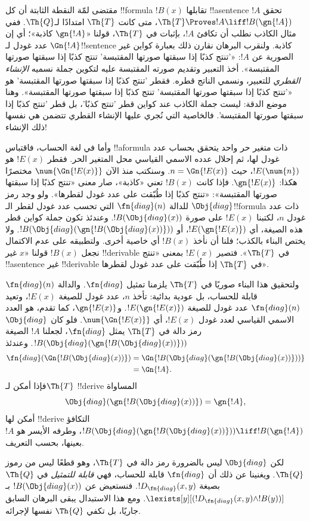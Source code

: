 \documentclass[../../../include/open-logic-section]{subfiles}
\begin{document}


\begin{explain}
مقتضى لمّة النقطة الثابتة أن كل !!{formula} $!B(x)$ تقابلها
!!a{sentence} $!A$ تحقق $\Th{T}\Proves !A\liff !B(\gn{!A})$،
متى كانت $\Th{T}$ امتدادًا لـ$\Th{Q}$. ففي مثال الكاذب نطلب
أن تكافئ $!A$، بإثبات في $\Th{T}$، قولنا «$\gn{!A}$ كاذبة»؛
أي إن $\Gn{!A}$ عدد غودل لـ!!{sentence} كاذبة. ولنقرب البرهان
نقارن ذلك بعبارة كواين غير الصورية عن $!A$: «'تنتج كذبًا إذا
سبقتها صورتها المقتبسة' تنتج كذبًا إذا سبقتها صورتها المقتبسة».
أخذ التعبير وتقديم صورته المقتبسة عليه لتكوين جملة نسميه
\emph{الإنشاء القطري} للتعبير، ونسمي الناتج قطره.
فقطر 'تنتج كذبًا إذا سبقتها صورتها المقتبسة' هو «'تنتج كذبًا إذا
سبقتها صورتها المقتبسة' تنتج كذبًا إذا سبقتها صورتها المقتبسة».
وهنا موضع الدقة: ليست جملة الكاذب عند كواين قطر 'تنتج كذبًا'،
بل قطر 'تنتج كذبًا إذا سبقتها صورتها المقتبسة'. فالخاصية التي
نُجري عليها الإنشاء القطري تتضمن هي نفسها ذلك الإنشاء!{}

وأما في لغة الحساب، فاقتباس !!a{formula} ذات متغير حر واحد
يتحقق بحساب عدد غودل لها، ثم إحلال عدده الاسمي القياسي محل
المتغير الحر. فقطر $!E(x)$ هو $!E(\num{n})$، حيث
$n=\Gn{!E(x)}$. وسنكتب منذ الآن $\num{\Gn{!E(x)}}$
مختصرًا هكذا: $\gn{!E(x)}$. فإذا كانت $!B(x)$ تعني «كاذبة»،
صار معنى «تنتج كذبًا إذا سبقتها صورتها المقتبسة»: «تنتج كذبًا
إذا طُبّقت على عدد غودل لقطرها». ولو وجد رمز $\Obj{diag}$
للدالة $\fn{diag}(n)$ التي تحسب عدد غودل لقطر الـ!!{formula}
ذات عدد غودل $n$، لكتبنا $!E(x)$ على صورة $!B(\Obj{diag}(x))$.
وعندئذ تكون جملة كواين قطر هذه الصيغة، أي $!E(\gn{!E(x)})$،
أو $!B(\Obj{diag}(\gn{!B(\Obj{diag}(x))}))$. ولا يختص البناء
بالكذب؛ فلنا أن نأخذ $!B(x)$ أي خاصية أخرى. ولتطبيقه على عدم
الاكتمال نجعل $!B(x)$ قولنا «$x$ غير !!{derivable} في
$\Th{T}$». فتصير $!E(x)$ بمعنى «تنتج !!a{sentence} غير
!!{derivable} في $\Th{T}$ إذا طُبّقت على عدد غودل لقطرها».

ولتحقيق هذا البناء صوريًا في $\Th{T}$ يلزمنا تمثيل
$\fn{diag}$. والدالة $\fn{diag}(n)$ قابلة للحساب، بل عودية
بدائية: تأخذ $n$، عدد غودل للصيغة $!E(x)$، وتعيد
$\fn{diag}(n)$ عدد غودل للصيغة $!E(\gn{!E(x)})$.
و$\gn{!E(x)}$، كما تقدم، هو العدد الاسمي القياسي لعدد غودل
$!E(x)$، أي $\num{\Gn{!E(x)}}$. فلو كان $\Obj{diag}$ رمز
دالة في $\Th{T}$ يمثل $\fn{diag}$، لجعلنا $!A$ الصيغة
$!B(\Obj{diag}(\gn{!B(\Obj{diag}(x))}))$. وعندئذ
\begin{align*}
\fn{diag}(\Gn{!B(\Obj{diag}(x))}) & =
\Gn{!B(\Obj{diag}(\gn{!B(\Obj{diag}(x))}))} \\
& = \Gn{!A}.
\end{align*}
فإذا أمكن لـ$\Th{T}$ !!{derive} المساواة
\[
\Obj{diag}(\gn{!B(\Obj{diag}(x))}) = \gn{!A},
\]
أمكن لها !!{derive} التكافؤ
$!B(\Obj{diag}(\gn{!B(\Obj{diag}(x))}))\liff !B(\gn{!A})$،
وطرفه الأيسر هو $!A$ بعينها، بحسب التعريف.

لكن $\Obj{diag}$ ليس بالضرورة رمز دالة في $\Th{T}$،
وهو قطعًا ليس من رموز $\Th{Q}$. ويغنينا عن ذلك أن $\fn{diag}$
قابلة للحساب، فهي \emph{قابلة للتمثيل} في $\Th{Q}$ بصيغة
$!D_{\fn{diag}}(x,y)$. فنستعيض عن $!B(\Obj{diag}(x))$
بـ$\lexists[y][(!D_{\fn{diag}}(x,y)\land !B(y))]$.
ومع هذا الاستبدال يبقى البرهان السابق جاريًا، بل تكفي
$\Th{Q}$ نفسها لإجرائه.
\end{explain}
\end{document}
